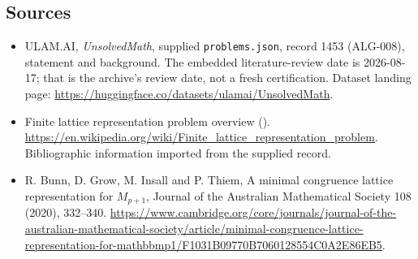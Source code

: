 \documentclass[11pt,a4paper]{article}
\begin{document}
\subsection{Sources}

{\small

\begin{itemize}

\item[\hypertarget{source:1453:1}{S1}] ULAM.AI, \emph{UnsolvedMath}, supplied \texttt{problems.json}, record 1453 (ALG-008), statement and background. The embedded literature-review date is 2026-08-17; that is the archive’s review date, not a fresh certification. Dataset landing page: \url{https://huggingface.co/datasets/ulamai/UnsolvedMath}.

\item[\hypertarget{source:1453:2}{S2}] Finite lattice representation problem overview (). \url{https://en.wikipedia.org/wiki/Finite_lattice_representation_problem}. Bibliographic information imported from the supplied record.

\item[R1] R. Bunn, D. Grow, M. Insall and P. Thiem, A minimal congruence lattice representation for $M_{p+1}$, Journal of the Australian Mathematical Society 108 (2020), 332--340.
\url{https://www.cambridge.org/core/journals/journal-of-the-australian-mathematical-society/article/minimal-congruence-lattice-representation-for-mathbbmp1/F1031B09770B7060128554C0A2E86EB5}.
\end{itemize}

}

\label{end:1453}
\end{document}
